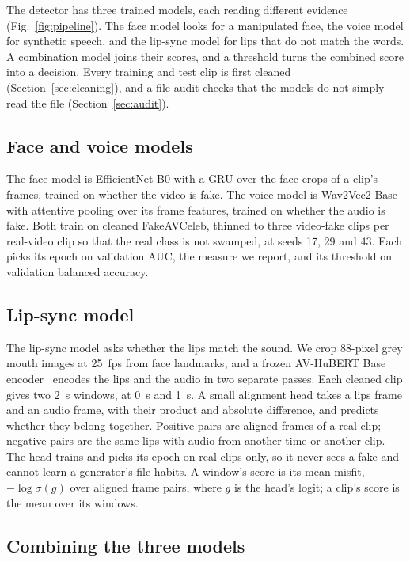 \documentclass[conference]{IEEEtran}
\begin{document}
The detector has three trained models, each reading different evidence
(Fig.~\ref{fig:pipeline}). The face model looks for a manipulated face, the
voice model for synthetic speech, and the lip-sync model for lips that do not
match the words. A combination model joins their scores, and a threshold turns
the combined score into a decision. Every training and test clip is first
cleaned (Section~\ref{sec:cleaning}), and a file audit checks that the models
do not simply read the file (Section~\ref{sec:audit}).

\subsection{Face and voice models}
\label{sec:paths}

The face model is EfficientNet-B0 with a GRU over the face crops of a clip's
frames, trained on whether the video is fake. The voice model is Wav2Vec2 Base
with attentive pooling over its frame features, trained on whether the audio
is fake. Both train on cleaned FakeAVCeleb, thinned to three video-fake clips
per real-video clip so that the real class is not swamped, at seeds 17, 29 and
43. Each picks its epoch on validation AUC, the measure we report, and its
threshold on validation balanced accuracy.

\subsection{Lip-sync model}
\label{sec:sync}

The lip-sync model asks whether the lips match the sound. We crop 88-pixel
grey mouth images at 25~fps from face landmarks, and a frozen AV-HuBERT Base
encoder~\cite{avhubert} encodes the lips and the audio in two separate passes.
Each cleaned clip gives two 2~s windows, at 0~s and 1~s. A small alignment head
takes a lips frame and an audio frame, with their product and absolute
difference, and predicts whether they belong together. Positive pairs are
aligned frames of a real clip; negative pairs are the same lips with audio
from another time or another clip. The head trains and picks its epoch on
real clips only, so it never sees a fake and cannot learn a generator's file
habits. A window's score is its mean misfit, $-\log\sigma(g)$ over aligned
frame pairs, where $g$ is the head's logit; a clip's score is the mean over its
windows.

\subsection{Combining the three models}
\label{sec:fusion}
\end{document}
